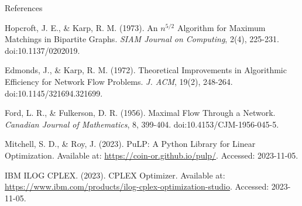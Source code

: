 \documentclass[final]{beamer}
\newlength{\onecolwid}
\begin{document}
\begin{columns}[t]
\begin{column}{\onecolwid}

      
\begin{block}{References}
  \scriptsize %
  \setlength{\parindent}{0pt} %
  \setlength{\parskip}{0pt} %
  \setlength{\itemsep}{0pt plus 0.2ex} %

  \begin{thebibliography}{9}

    Hopcroft, J. E., \& Karp, R. M. (1973). An \(n^{5/2}\) Algorithm for Maximum Matchings in Bipartite Graphs. \textit{SIAM Journal on Computing}, 2(4), 225-231. doi:10.1137/0202019.

    Edmonds, J., \& Karp, R. M. (1972). Theoretical Improvements in Algorithmic Efficiency for Network Flow Problems. \textit{J. ACM}, 19(2), 248-264. doi:10.1145/321694.321699.

    Ford, L. R., \& Fulkerson, D. R. (1956). Maximal Flow Through a Network. \textit{Canadian Journal of Mathematics}, 8, 399-404. doi:10.4153/CJM-1956-045-5.

    Mitchell, S. D., \& Roy, J. (2023). PuLP: A Python Library for Linear Optimization. Available at: \url{https://coin-or.github.io/pulp/}. Accessed: 2023-11-05.

    IBM ILOG CPLEX. (2023). CPLEX Optimizer. Available at: \url{https://www.ibm.com/products/ilog-cplex-optimization-studio}. Accessed: 2023-11-05.

  \end{thebibliography}
\end{block}





    \end{column} 
    
  \end{columns}
  
\end{document}
